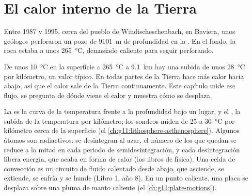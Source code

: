 \chapter{El calor interno de la Tierra}\label{ch:g12:internal-heat}

Entre 1987 y 1995, cerca del pueblo de Windischeschenbach, en Baviera, unos
geólogos perforaron un pozo de \qty{9101}{m} de profundidad en la . En el fondo, la roca estaba a unos \qty{265}{\celsius},
demasiado caliente para seguir perforando.

De unos \qty{10}{\celsius} en la superficie a \qty{265}{\celsius} a
\qty{9.1}{km} hay una subida de unos \qty{28}{\celsius} por kilómetro, un
valor típico. En todas partes de la Tierra hace más calor hacia abajo, así que
el calor sale de la Tierra continuamente. Este capítulo mide ese flujo, se
pregunta de dónde viene el calor y muestra cómo se desplaza.

\begin{recall}
La  es la curva de la temperatura frente a la profundidad bajo un
lugar, y el , la subida de la temperatura por kilómetro;
los sondeos miden de 25 a \qty{30}{\celsius} por kilómetro cerca de la
superficie (el \cref{ch:g11:lithosphere-asthenosphere}). Algunos átomos son
radiactivos: se desintegran al azar, el número de los que quedan se reduce a la
mitad en cada periodo de semidesintegración, y cada desintegración libera
energía, que acaba en forma de calor (los libros de física). Una celda de
convección es un circuito de fluido calentado desde abajo, que asciende, se
extiende, se enfría y se hunde (Libro 1, año 8). En un punto caliente, una
placa se desplaza sobre una pluma de manto caliente (el
\cref{ch:g11:plate-motions}).
\end{recall}

